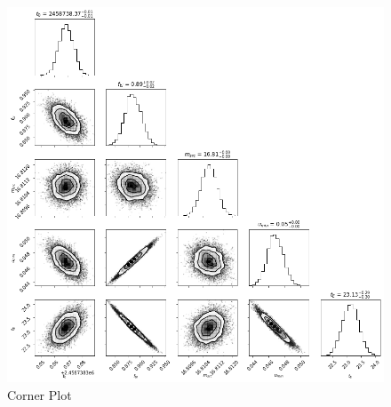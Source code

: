 \documentclass{article}
\begin{document}
        \begin{figure}[H]
            \begin{center}
                \includegraphics[scale = 0.35]{Images/2019-BLG-1307_Corner_Plot.png}
                \caption{Corner Plot}
                \label{fig:2019-BLG-0001 Corner Plot}
            \end{center}
        \end{figure}
    
\end{document}
